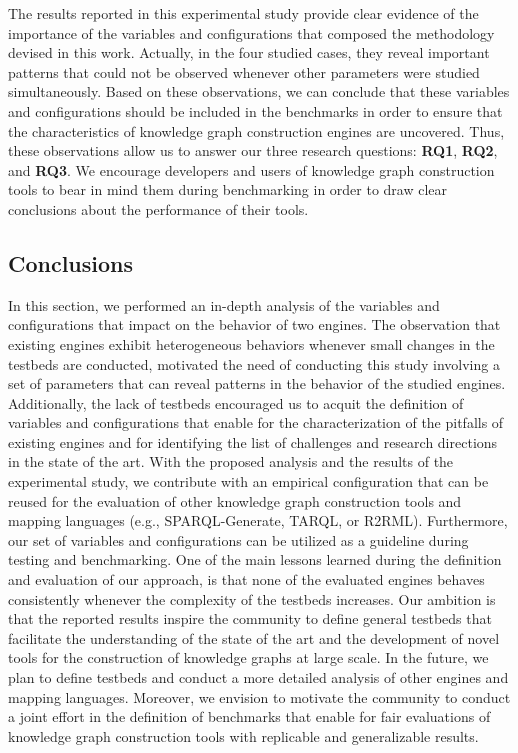 The results reported in this experimental study provide clear evidence of the importance of the variables and configurations that composed the methodology devised in this work. Actually, in the four studied cases, they reveal important patterns that could not be observed whenever other parameters were studied simultaneously. Based on these observations, we can conclude that these variables and configurations should be included in the benchmarks in order to ensure that the characteristics of knowledge graph construction engines are uncovered. Thus, these observations allow us to answer our three research questions: \textbf{RQ1}, \textbf{RQ2}, and \textbf{RQ3}. We encourage developers and users of knowledge graph construction tools to bear in mind them during benchmarking in order to draw clear conclusions about the performance of their tools.


\subsection{Conclusions}
In this section, we performed an in-depth analysis of the variables and configurations that impact on the behavior of two engines. The observation that existing engines exhibit heterogeneous behaviors whenever small changes in the testbeds are conducted, motivated the need of conducting this study involving a set of parameters that can reveal patterns in the behavior of the studied engines. Additionally, the lack of testbeds encouraged us to acquit the definition of variables and configurations that enable for the characterization of the pitfalls of existing engines and for identifying the list of challenges and research directions in the state of the art. 
With the proposed analysis and the results of the experimental study, we contribute with an empirical configuration that can be reused for the evaluation of other knowledge graph construction tools and mapping languages (e.g., SPARQL-Generate, TARQL, or R2RML). Furthermore, our set of variables and configurations can be utilized as a guideline during testing and benchmarking. One of the main lessons learned during the definition and evaluation of our approach, is that none of the evaluated engines behaves consistently whenever the complexity of the testbeds increases. Our ambition is that the reported results inspire the community to define general testbeds that facilitate the understanding of the state of the art and the development of novel tools for the construction of knowledge graphs at large scale.  In the future, we plan to define testbeds and conduct a more detailed analysis of other engines and mapping languages. Moreover, we envision to motivate the community to conduct a joint effort in the definition of benchmarks that enable for fair evaluations of knowledge graph construction tools with replicable and generalizable results. 


